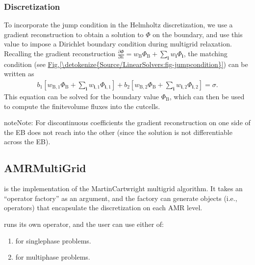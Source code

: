 \documentclass[letterpaper,10pt,english]{sphinxmanual}
\begin{document}
\subsubsection{Discretization}
\label{\detokenize{Source/LinearSolvers:discretization}}
To incorporate the jump condition in the Helmholtz discretization, we use a gradient reconstruction to obtain a solution to \(\Phi\) on the boundary, and use this value to impose a Dirichlet boundary condition during multigrid relaxation.
Recalling the gradient reconstruction \(\frac{\partial\Phi}{\partial n} = w_{\textrm{B}}\Phi_{\textrm{B}} + \sum_{\mathbf{i}} w_{\mathbf{i}}\Phi_{\mathbf{i}}\), the matching condition (see \hyperref[\detokenize{Source/LinearSolvers:fig-jumpcondition}]{Fig.\@ \ref{\detokenize{Source/LinearSolvers:fig-jumpcondition}}}) can be written as
\begin{equation*}
\begin{split}b_1\left[w_{\textrm{B},1}\Phi_{\textrm{B}} + \sum_{\mathbf{i}} w_{\mathbf{i},1}\Phi_{\mathbf{i},1}\right] + b_2\left[w_{\textrm{B},2}\Phi_{\textrm{B}} + \sum_{\mathbf{i}} w_{\mathbf{i},2}\Phi_{\mathbf{i},2}\right] = \sigma.\end{split}
\end{equation*}
This equation can be solved for the boundary value \(\Phi_{\textrm{B}}\), which can then be used to compute the finite\sphinxhyphen{}volume fluxes into the cut\sphinxhyphen{}cells.

\begin{sphinxadmonition}{note}{Note:}
For discontinuous coefficients the gradient reconstruction on one side of the EB does not reach into the other (since the solution is not differentiable across the EB).
\end{sphinxadmonition}


\subsection{AMRMultiGrid}
\label{\detokenize{Source/LinearSolvers:amrmultigrid}}
 is the  implementation of the Martin\sphinxhyphen{}Cartwright multigrid algorithm.
It takes an “operator factory” as an argument, and the factory can generate objects (i.e., operators) that encapsulate the discretization on each AMR level.

 runs its own operator, and the user can use either of:
\begin{enumerate}
%
\item {} 
 for single\sphinxhyphen{}phase problems.

\item {} 
 for multi\sphinxhyphen{}phase problems.

\end{enumerate}
\end{document}
